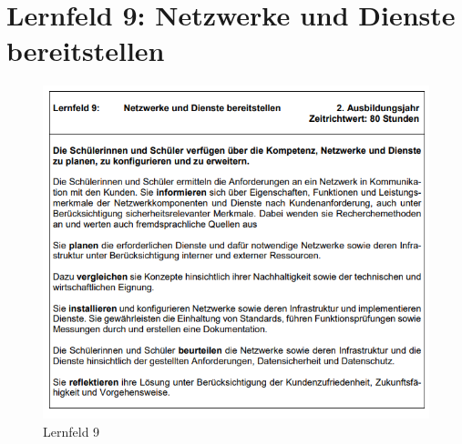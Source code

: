 \section{Lernfeld 9: Netzwerke und Dienste bereitstellen}

\begin{figure}
    [H]
    \centering
    \includegraphics[width=\textwidth]{figures/lernfeld9.png}
    \caption{Lernfeld 9}
    \label{fig:lernfeld9}
\end{figure}